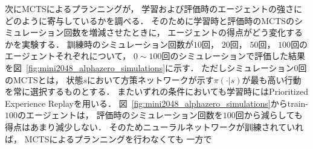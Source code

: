 次にMCTSによるプランニングが， 学習および評価時のエージェントの強さにどのように寄与しているかを調べる．
そのために学習時と評価時のMCTSのシミュレーション回数を増減させたときに， エージェントの得点がどう変化するかを実験する．
訓練時のシミュレーション回数が$10$回， $20$回， $50$回， $100$回のエージェントそれぞれについて， $0 \sim 100$回のシミュレーションで評価した結果を図~\ref{fig:mini2048_alphazero_simulations}に示す．
ただしシミュレーション$0$回のMCTSとは， 状態$s$において方策ネットワークが示す$\pi(\cdot|s)$が最も高い行動を常に選択するものとする．
またいずれの条件においても学習時にはPrioritized Experience Replayを用いる．
図~\ref{fig:mini2048_alphazero_simulations}からtrain-$100$のエージェントは， 評価時のシミュレーション回数を$100$回から減らしても得点はあまり減少しない．
そのためニューラルネットワークが訓練されていれば， MCTSによるプランニングを行わなくても
一方で
